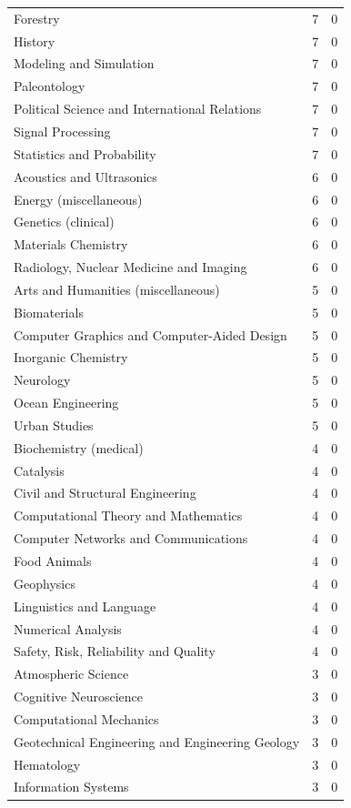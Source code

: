 \documentclass[12pt,brazil]{article}\usepackage[]{graphicx}\usepackage[]{xcolor}
\begin{document}
\begin{longtable}{lrr}
Forestry & 7 & 0 \\
History & 7 & 0 \\
Modeling and Simulation & 7 & 0 \\
Paleontology & 7 & 0 \\
Political Science and International Relations & 7 & 0 \\
Signal Processing & 7 & 0 \\
Statistics and Probability & 7 & 0 \\
Acoustics and Ultrasonics & 6 & 0 \\
Energy (miscellaneous) & 6 & 0 \\
Genetics (clinical) & 6 & 0 \\
Materials Chemistry & 6 & 0 \\
Radiology, Nuclear Medicine and Imaging & 6 & 0 \\
Arts and Humanities (miscellaneous) & 5 & 0 \\
Biomaterials & 5 & 0 \\
Computer Graphics and Computer-Aided Design & 5 & 0 \\
Inorganic Chemistry & 5 & 0 \\
Neurology & 5 & 0 \\
Ocean Engineering & 5 & 0 \\
Urban Studies & 5 & 0 \\
Biochemistry (medical) & 4 & 0 \\
Catalysis & 4 & 0 \\
Civil and Structural Engineering & 4 & 0 \\
Computational Theory and Mathematics & 4 & 0 \\
Computer Networks and Communications & 4 & 0 \\
Food Animals & 4 & 0 \\
Geophysics & 4 & 0 \\
Linguistics and Language & 4 & 0 \\
Numerical Analysis & 4 & 0 \\
Safety, Risk, Reliability and Quality & 4 & 0 \\
Atmospheric Science & 3 & 0 \\
Cognitive Neuroscience & 3 & 0 \\
Computational Mechanics & 3 & 0 \\
Geotechnical Engineering and Engineering Geology & 3 & 0 \\
Hematology & 3 & 0 \\
Information Systems & 3 & 0 \\

\end{longtable}
\end{document}
